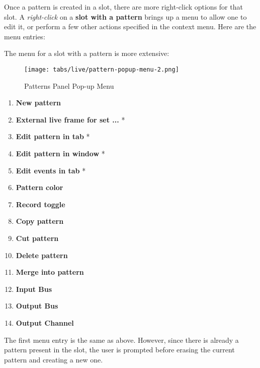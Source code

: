    Once a pattern is created in a slot, there are more
   right-click options for that slot.
   A \textsl{right-click} on a \textbf{slot with a pattern} brings up a menu
   to allow one to edit it, or perform a few other actions
   specified in the context menu.  Here are the menu entries:


   The menu for a slot with a pattern is more extensive:

\begin{figure}[H]
   \centering 
   \texttt{[image: tabs/live/pattern-popup-menu-2.png]}
   \caption{Patterns Panel Pop-up Menu}
   \label{fig:patterns_panel_popup_menu}
\end{figure}

   \begin{enumerate}
      \item \textbf{New pattern}
      \item \textbf{External live frame for set ...} *
      \item \textbf{Edit pattern in tab} *
      \item \textbf{Edit pattern in window} *
      \item \textbf{Edit events in tab} *
      \item \textbf{Pattern color}
      \item \textbf{Record toggle}
      \item \textbf{Copy pattern}
      \item \textbf{Cut pattern}
      \item \textbf{Delete pattern}
      \item \textbf{Merge into pattern}
      \item \textbf{Input Bus}
      \item \textbf{Output Bus}
      \item \textbf{Output Channel}
   \end{enumerate}

   The first menu entry is the same as above.  However, since there is
   already a pattern present in the slot, the user is prompted before erasing
   the current pattern and creating a new one.

